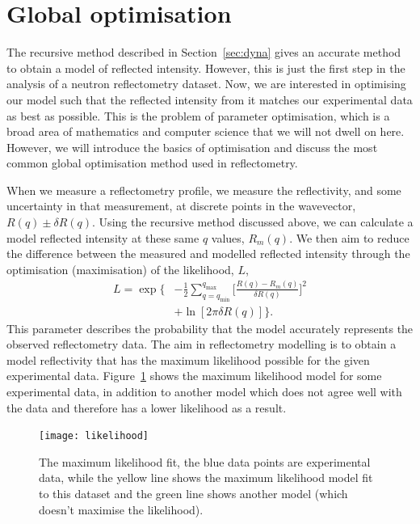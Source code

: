 \documentclass[
 reprint,
 superscriptaddress,
 amsmath,amssymb,
 aps,
]{revtex4-1}
\begin{document}
\section{Global optimisation}

The recursive method described in Section~\ref{sec:dyna} gives an accurate method to obtain a model of reflected intensity.
However, this is just the first step in the analysis of a neutron reflectometry dataset.
Now, we are interested in optimising our model such that the reflected intensity from it matches our experimental data as best as possible.
This is the problem of parameter optimisation, which is a broad area of mathematics and computer science that we will not dwell on here.
However, we will introduce the basics of optimisation and discuss the most common global optimisation method used in reflectometry.

When we measure a reflectometry profile, we measure the reflectivity, and some uncertainty in that measurement, at discrete points in the wavevector, $R(q) \pm \delta R(q)$.
Using the recursive method discussed above, we can calculate a model reflected intensity at these same $q$ values, $R_m(q)$.
We then aim to reduce the difference between the measured and modelled reflected intensity through the optimisation (maximisation) of the likelihood, $L$, %
%
\begin{equation}
    \begin{aligned}
        L = \exp\bigg\{ & - \frac{1}{2} \sum_{q=q_{\text{min}}}^{q_{\text{max}}} \bigg[\frac{R(q) - R_m(q)}{\delta R(q)}\bigg]^2 \\
         & + \ln[2\pi \delta R(q)]\bigg\}.
    \end{aligned}
\end{equation}
%
This parameter describes the probability that the model accurately represents the observed reflectometry data.
The aim in reflectometry modelling is to obtain a model reflectivity that has the maximum likelihood possible for the given experimental data.
Figure~\ref{fig:likelihood} shows the maximum likelihood model for some experimental data, in addition to another model which does not agree well with the data and therefore has a lower likelihood as a result.
%
\begin{figure}[t]
    \texttt{[image: likelihood]}
    \caption{The maximum likelihood fit, the blue data points are experimental data, while the yellow line shows the maximum likelihood model fit to this dataset and the green line shows another model (which doesn't maximise the likelihood).}
    \label{fig:likelihood}
\end{figure}
%
\end{document}
